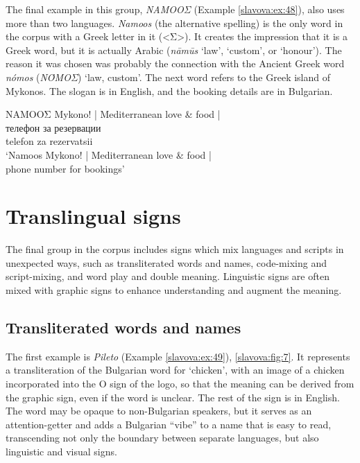 \documentclass[output=paper]{langscibook}
\begin{document}
The final example in this group, \textit{NAMOOΣ} (Example \ref{slavova:ex:48}), also uses more than two languages. \textit{Namoos} (the alternative spelling) is the only word in the corpus with a Greek letter in it (<Σ>). It creates the impression that it is a Greek word, but it is actually Arabic (\textit{nāmūs} ‘law’, ‘custom’, or ‘honour’). The reason it was chosen was probably the connection with the Ancient Greek word \textit{nómos} (\textit{ΝΌΜΟΣ}) ‘law, custom’. The next word refers to the Greek island of Mykonos. The slogan is in English, and the booking details are in Bulgarian.


\begin{exe}
  \ex\label{slavova:ex:48}
 {NAMOOΣ Mykono! | Mediterranean love \& food |} \\
  \gll телефон за резервации \\
   telefon za rezervatsii \\
  \glt ‘Namoos Mykono! | Mediterranean love \& food | \\ phone number for bookings’
\end{exe}


\section{Translingual signs}\label{slavova:sec:7}
The final group in the corpus includes signs which mix languages and scripts in unexpected ways, such as transliterated words and names, code-mixing and script-mixing, and word play and double meaning. Linguistic signs are often mixed with graphic signs to enhance understanding and augment the meaning.

\subsection{Transliterated words and names}
The first example is \textit{Pileto} (Example \ref{slavova:ex:49}), \autoref{slavova:fig:7}. It represents a transliteration of the Bulgarian word for ‘chicken’, with an image of a chicken incorporated into the O sign of the logo, so that the meaning can be derived from the graphic sign, even if the word is unclear. The rest of the sign is in English. The word may be opaque to non-Bulgarian speakers, but it serves as an attention-getter and adds a Bulgarian ``vibe'' to a name that is easy to read, transcending not only the boundary between separate languages, but also linguistic and visual signs.
\end{document}
